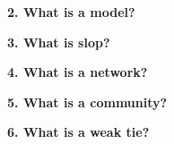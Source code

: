\documentclass[11pt]{article}
\newcommand{\fixedblock}[2][5.7cm]{\noindent\begin{minipage}[t][#1][t]{\linewidth}\raggedright #2\end{minipage}\par}
\begin{document}
\vfill

\fixedblock[0.255\textheight]{%
\noindent\textbf{2. What is a model?}}

\vfill

\fixedblock[0.255\textheight]{%
\noindent\textbf{3. What is slop?}}

\newpage

\fixedblock[0.31\textheight]{%
\noindent\textbf{4. What is a network?}}

\vfill

\fixedblock[0.31\textheight]{%
\noindent\textbf{5. What is a community?}}

\vfill

\fixedblock[0.31\textheight]{%
\noindent\textbf{6. What is a weak tie?}}
\end{document}
